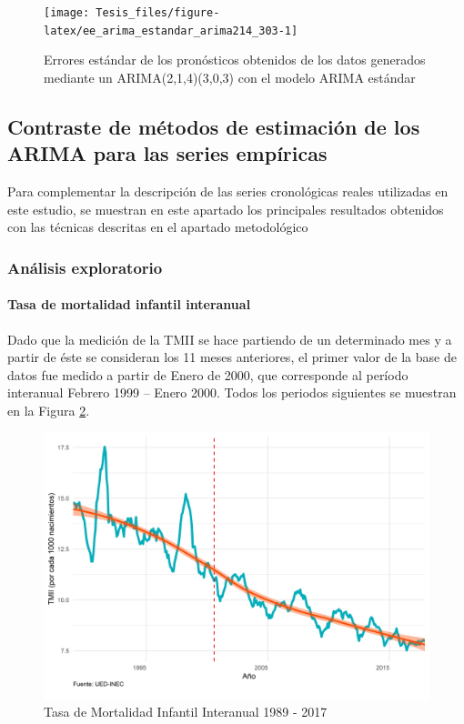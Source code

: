 \documentclass[
]{article}
\begin{document}
\begin{figure}[H]
\texttt{[image: Tesis\_files/figure-latex/ee\_arima\_estandar\_arima214\_303-1]} \caption{Errores estándar de los pronósticos obtenidos de los datos generados mediante un ARIMA(2,1,4)(3,0,3) con el modelo ARIMA estándar}\label{fig:ee_arima_estandar_arima214_303}
\end{figure}

\subsection{Contraste de métodos de estimación de los ARIMA para las series empíricas}

Para complementar la descripción de las series cronológicas reales
utilizadas en este estudio, se muestran en este apartado los principales
resultados obtenidos con las técnicas descritas en el apartado
metodológico

\subsubsection{Análisis exploratorio}

\paragraph{Tasa de mortalidad infantil interanual}

Dado que la medición de la TMII se hace partiendo de un determinado mes
y a partir de éste se consideran los 11 meses anteriores, el primer
valor de la base de datos fue medido a partir de Enero de 2000, que
corresponde al período interanual Febrero 1999 -- Enero 2000. Todos los
periodos siguientes se muestran en la Figura \ref{fig:tmiiplotgeneral}.

\begin{figure}[H]
\includegraphics[width=1\linewidth,height=1\textheight]{Tesis_files/figure-latex/tmiiplotgeneral-1} \caption{Tasa de Mortalidad Infantil Interanual 1989 - 2017}\label{fig:tmiiplotgeneral}
\end{figure}
\end{document}

